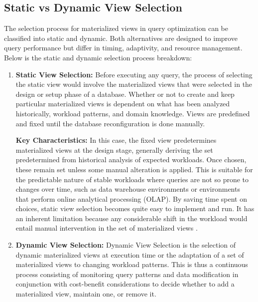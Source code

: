 \subsection{ Static vs Dynamic View Selection } The selection process for materialized views in query optimization can be classified into static and dynamic. Both alternatives are designed to improve query performance but differ in timing, adaptivity, and resource management. Below is the static and dynamic selection process breakdown:
\begin{enumerate}
        \item \textbf{Static View Selection:} Before executing any query, the process of selecting the static view would involve the materialized views that were selected in the design or setup phase of a database. Whether or not to create and keep particular materialized views is dependent on what has been analyzed historically, workload patterns, and domain knowledge. Views are predefined and fixed until the database reconfiguration is done manually.\vspace{.4cm}
    
    \textbf{Key Characteristics:} In this case, the fixed view predetermines materialized views at the design stage, generally deriving the set predetermined from historical analysis of expected workloads. Once chosen, these remain set unless some manual alteration is applied. This is suitable for the predictable nature of stable workloads where queries are not so prone to changes over time, such as data warehouse environments or environments that perform online analytical processing (OLAP). By saving time spent on choices, static view selection becomes quite easy to implement and run. It has an inherent limitation because any considerable shift in the workload would entail manual intervention in the set of materialized views \cite{lohman2000selftuning,mamoulis2012survey,gupta2002selftuning}.
    \item \textbf{Dynamic View Selection:} Dynamic View Selection is the selection of dynamic materialized views at execution time or the adaptation of a set of materialized views to changing workload patterns. This is thus a continuous process consisting of monitoring query patterns and data modification in conjunction with cost-benefit considerations to decide whether to add a materialized view, maintain one, or remove it.\vspace{.4cm}
    

\end{enumerate}
